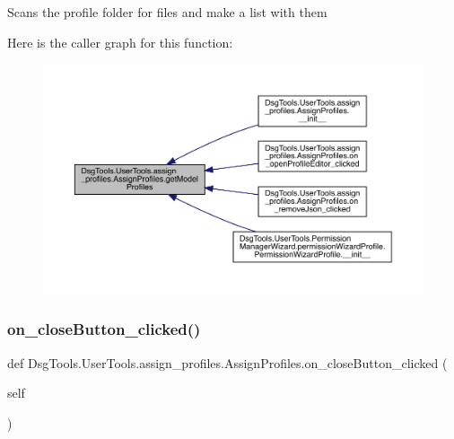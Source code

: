 \begin{DoxyVerb}Scans the profile folder for files and make a list with them
\end{DoxyVerb}
 Here is the caller graph for this function\+:
\nopagebreak
\begin{figure}[H]
\begin{center}
\leavevmode
\includegraphics[width=350pt]{class_dsg_tools_1_1_user_tools_1_1assign__profiles_1_1_assign_profiles_a88946e6ab8e738c3afed611c7544c96f_icgraph}
\end{center}
\end{figure}
\mbox{\label{class_dsg_tools_1_1_user_tools_1_1assign__profiles_1_1_assign_profiles_a563b41c7c68ac432b8e6300c1a1ee722}} 
\subsubsection{\texorpdfstring{on\+\_\+close\+Button\+\_\+clicked()}{on\_closeButton\_clicked()}}
{\footnotesize\ttfamily def Dsg\+Tools.\+User\+Tools.\+assign\+\_\+profiles.\+Assign\+Profiles.\+on\+\_\+close\+Button\+\_\+clicked (\begin{DoxyParamCaption}\item[{}]{self }\end{DoxyParamCaption})}

